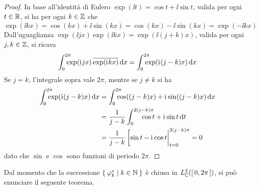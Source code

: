 	\begin{proof}
		In base all'identità di Eulero \(\exp (\ii t) = \cos t + \ii \sin t\), valida per ogni \(t \in \mathbb{R}\), si ha per ogni \(k \in \mathbb{Z}\) che
		\begin{equation*}
			\overline{\exp (\ii k x)} = \overline{\cos (k x) + \ii \sin (k x)} = \cos (k x) - \ii \sin (k x) = \exp (- \ii k x)
		\end{equation*}
		Dall'uguaglianza \(\exp (\ii j x) \exp (\ii k x) = \exp (\ii (j + k) x)\), valida per ogni \(j, k \in \mathbb{Z}\), si ricava
		\begin{equation*}
			\int_0^{\mathrlap{2 \pi}} \exp (\ii j x) \, \overline{\exp(\ii k x)} \dd{x} = \int_0^{\mathrlap{2 \pi}} \exp (\ii (j - k) x) \dd{x}
		\end{equation*}
		Se \(j = k\), l'integrale sopra vale \(2 \pi\), mentre se \(j \ne k\) si ha
		\begin{equation*}
			\begin{split}
				\int_0^{\mathrlap{2 \pi}} \exp (\ii (j - k) x) \dd{x} &= \int_0^{\mathrlap{2 \pi}} \cos ((j - k) x) + \ii \sin ((j - k) x) \dd{x} \\
				&= \frac{1}{j - k} \int_0^{\mathrlap{2 (j - k) \pi}} \quad \cos t + \ii \sin t \dd{t} \\
				&= \frac{1}{j - k} \eval[\sin t - \ii \cos t|_{t = 0}^{2 (j - k) \pi} = 0
			\end{split}
		\end{equation*}
		dato che \(\sin\) e \(\cos\) sono funzioni di periodo \(2 \pi\).
	\end{proof}

	Dal momento che la successione \(\Set{\varphi_k^* | k \in \mathbb{N}}\) è chiusa in \(L_\mathbb{C}^2 ([\, 0, 2 \pi \,])\), si può enunciare il seguente teorema.
	
